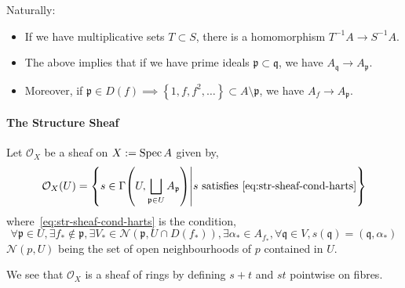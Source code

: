 \documentclass[000-main.tex]{subfiles}
\begin{document}
Naturally:
\begin{itemize}
  \item If we have multiplicative sets $T \subset S$, there is a homomorphism $T^{-1}A \to S^{-1}A$.
  \item The above implies that if we have prime ideals $\mathfrak{p}\subset\mathfrak{q}$, we have $A_\mathfrak{q} \to A_\mathfrak{p}$.
  \item Moreover, if $\mathfrak{p}\in D(f) \implies \left\{ 1, f, f^2, \ldots \right\}\subset A\setminus\mathfrak{p}$, we have $A_f \to A_\mathfrak{p}$.
\end{itemize}

\paragraph{The Structure Sheaf}

\begin{definition}
  Let $\mathcal{O}_X$ be a sheaf on $X := \operatorname{Spec} A$ given by,
  \[
    \mathcal{O}_X(U) = \qty{
      s \in \Gamma\qty(U, \bigsqcup_{\mathfrak{p} \in U} A_{\mathfrak{p}})
      \middle\vert
      s\text{ satisfies~\eqref{eq:str-sheaf-cond-harts}}
    }
  \]
  where~\eqref{eq:str-sheaf-cond-harts} is the condition,
  \begin{equation}\label{eq:str-sheaf-cond-harts}
      \forall \mathfrak{p}\in U,
      \exists f_{\ast} \not\in \mathfrak{p},
      \exists V_{\ast}\in \mathcal{N}(\mathfrak{p}, U\cap D(f_{\ast})),
      \exists \alpha_{\ast} \in A_{f_\ast},
      \forall \mathfrak{q} \in V, s(\mathfrak{q}) = (\mathfrak{q}, \alpha_{\ast})
      \tag{\ast}
  \end{equation}
  $\mathcal{N}(p, U)$ being the set of open neighbourhoods of $p$ contained in $U$.

  We see that $\mathcal{O}_X$ is a sheaf of rings by defining $s + t$ and $st$ pointwise on fibres.
\end{definition}
\end{document}
